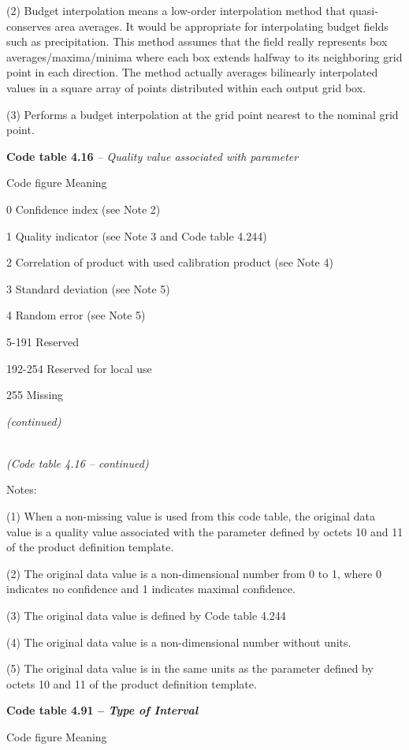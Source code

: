 (2) Budget interpolation means a low-order interpolation method that quasi-conserves area averages. It would be appropriate for interpolating budget fields such as precipitation. This method assumes that the field really represents box averages/maxima/minima where each box extends halfway to its neighboring grid point in each direction. The method actually averages bilinearly interpolated values in a square array of points distributed within each output grid box.

(3) Performs a budget interpolation at the grid point nearest to the nominal grid point.

\textbf{Code table 4.16} \emph{-- Quality value associated with parameter}

Code figure Meaning

0 Confidence index (see Note 2)

1 Quality indicator (see Note 3 and Code table 4.244)

2 Correlation of product with used calibration product (see Note 4)

3 Standard deviation (see Note 5)

4 Random error (see Note 5)

5-191 Reserved

192-254 Reserved for local use

255 Missing

\emph{(continued)}

\emph{\\
(Code table 4.16 -- continued)}

Notes:

(1) When a non-missing value is used from this code table, the original data value is a quality value associated with the parameter defined by octets 10 and 11 of the product definition template.

(2) The original data value is a non-dimensional number from 0 to 1, where 0 indicates no confidence and 1 indicates maximal confidence.

(3) The original data value is defined by Code table 4.244

(4) The original data value is a non-dimensional number without units.

(5) The original data value is in the same units as the parameter defined by octets 10 and 11 of the product definition template.

\textbf{Code table 4.91 -- \emph{Type of Interval}}

Code figure Meaning

